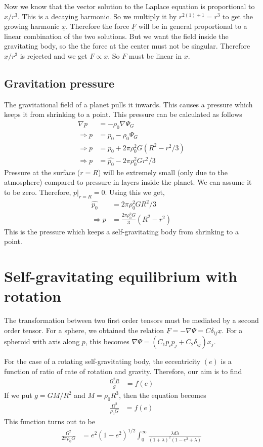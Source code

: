 \documentclass[11pt,a4paper]{article}
\newcommand{\dl}{\delta}
\newcommand{\vect}[1]{\underline{#1}}
\newcommand{\1}{\vect{1}}
\newcommand{\grad}{\nabla}
\begin{document}
Now we know that the vector solution to the Laplace equation is proportional to $\vect x/r^3$. This is a decaying harmonic. So we multiply it by $r^{2(1)+1} = r^3$ to get the growing harmonic $\vect x$. Therefore the force $\vect F$ will be in general proportional to a linear combination of the two solutions. But we want the field inside the gravitating body, so the the force at the center must not be singular. Therefore $\vect x/r^3$ is rejected and we get $\vect F \propto \vect x $. So $\vect F$ must be linear in $\vect x$.

\subsection{Gravitation pressure}

The gravitational field of a planet pulls it inwards. This causes a pressure which keeps it from shrinking to a point. This pressure can be calculated as follows
\begin{align*}
\grad p &= -\rho_0 \grad \Psi_G\\
\Rightarrow p &= p_0 - \rho_0 \Psi_G \\
\Rightarrow p &= p_0 + 2 \pi \rho_0^2 G (R^2 - r^2/3) \\
\Rightarrow p &= \hat{p_0} - 2 \pi \rho_0^2 G r^2/3
\end{align*}
Pressure at the surface ($r=R$) will be extremely small (only due to the atmosphere) compared to pressure in layers inside the planet. We can assume it to be zero. Therefore, $p|_{r=R} = 0$. Using this we get,
\begin{align*}
\hat{p_0} &= 2 \pi \rho_0^2 G R^2/3 \\
\Rightarrow p &= \frac{2 \pi \rho_0^2 G}{3} (R^2 - r^2)
\end{align*}
This is the pressure which keeps a self-gravitating body from shrinking to a point.

\section{Self-gravitating equilibrium with rotation}
The transformation between two first order tensors must be mediated by a second order tensor. For a sphere, we obtained the relation $\vect F = -\grad \Psi = C \dl_{ij}\vect x$. For a spheroid with axis along $\vect p$, this becomes $\grad \Psi = (C_1 p_ip_j + C_2 \dl_{ij})x_j$. 

For the case of a rotating self-gravitating body, the eccentricity $(e)$ is a function of ratio of rate of rotation and gravity. Therefore, our aim is to find 
\begin{align*}
\frac{\Omega^2 R}{g} &= f(e)
\end{align*}
If we put $g = GM/R^2$ and $M=\rho_0 R^3$, then the equation becomes
\begin{align*}
\frac{\Omega^2}{\rho_0 G} &= f(e)
\end{align*}
This function turns out to be
\begin{align*}
\frac{\Omega^2}{2 \pi \rho_0 G} &= e^2(1-e^2)^{1/2}\int_0^{\infty}\frac{\lambda d\lambda}{(1+\lambda)^2(1-e^2+\lambda)}
\end{align*}
\end{document}
